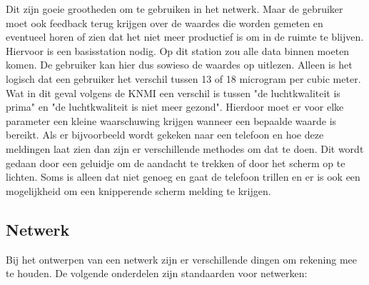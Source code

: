 Dit zijn goeie grootheden om te gebruiken in het netwerk. Maar de gebruiker moet ook feedback terug krijgen over de waardes die worden
gemeten en eventueel horen of zien dat het niet meer productief is om in de ruimte te blijven. Hiervoor is een basisstation nodig. 
Op dit station zou alle data binnen moeten komen. De gebruiker kan hier dus sowieso de waardes op uitlezen. Alleen is het logisch dat
een gebruiker het verschil tussen 13 of 18 microgram per cubic meter. Wat in dit geval volgens de KNMI \cite{Gezonde} een verschil is tussen
"de luchtkwaliteit is prima" en "de luchtkwaliteit is niet meer gezond". Hierdoor moet er voor elke parameter een kleine waarschuwing krijgen
wanneer een bepaalde waarde is bereikt. Als er bijvoorbeeld wordt gekeken naar een telefoon en hoe deze meldingen laat zien dan zijn er 
verschillende methodes om dat te doen. Dit wordt gedaan door een geluidje om de aandacht te trekken of door het scherm op te lichten. Soms
is alleen dat niet genoeg en gaat de telefoon trillen en er is ook een mogelijkheid om een knipperende scherm melding te krijgen.

\subsection{Netwerk}

Bij het ontwerpen van een netwerk zijn er verschillende dingen om rekening mee te houden. De volgende onderdelen zijn standaarden voor netwerken: 

